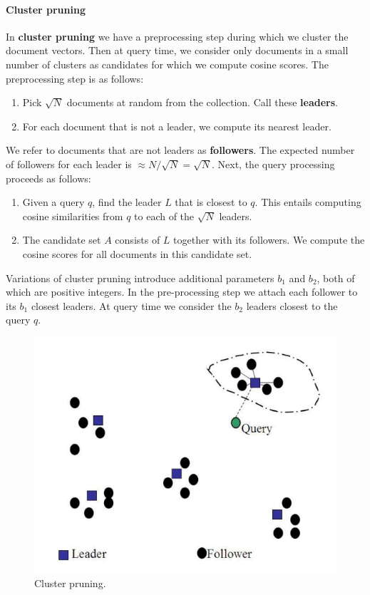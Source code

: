 \documentclass[letterpaper,11pt]{article}
\begin{document}
\paragraph{Cluster pruning}
In \textbf{cluster pruning} we have a preprocessing step during which we cluster the document vectors. Then at query time, we consider only documents in a small number of clusters as candidates for which we compute cosine scores. The preprocessing step is as follows:
\begin{enumerate}
    \item Pick $\sqrt{N}$ documents at random from the collection. Call these \textbf{leaders}.
    \item For each document that is not a leader, we compute its nearest leader.
\end{enumerate}
 We refer to documents that are not leaders as \textbf{followers}. The expected number of followers for each leader is $\approx N/\sqrt{N} = \sqrt{N}$. Next, the query processing proceeds as follows:
 \begin{enumerate}
    \item Given a query $q$, find the leader $L$ that is closest to $q$. This entails computing cosine similarities from $q$ to each of the $\sqrt{N}$ leaders.
    \item The candidate set $A$ consists of $L$ together with its followers. We compute the cosine scores for all documents in this candidate set.
\end{enumerate}

Variations of cluster pruning introduce additional parameters $b_1$ and $b_2$, both of which are positive integers. In the pre-processing step we attach each follower to its $b_1$ closest leaders. At query time we consider the $b_2$ leaders closest to the query $q$.
\begin{figure}[H]
    \centering
    \includegraphics[scale=0.60]{sect7/figure_7_3.png}
    \caption{Cluster pruning.}
\end{figure}
\end{document}
